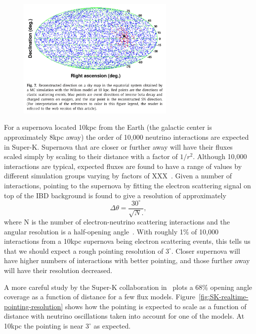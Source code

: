 \documentclass[11pt]{article}
\newcommand{\superk}  {Super\nobreakdash-K\xspace}
\begin{document}
\begin{figure}
  \begin{center}
    \includegraphics[width=3.0in]{SK-realtime-monitor-pointing}
    \caption{}
    \label{fig:SK-realtime-monitor-pointing}
  \end{center}
\end{figure}

For a supernova located 10kpc from the Earth (the galactic center is
approximately 8kpc away) the order of 10,000 neutrino interactions are
expected in \superk.  Supernova that are closer or further away will
have their fluxes scaled simply by scaling to their distance with a
factor of $1/r^2$.  Although 10,000 interactions are typical, expected
fluxes are found to have a range of values by different simulation
groups varying by factors of XXX~\cite{model_references}.  Given a
number of interactions, pointing to the supernova by fitting the
electron scattering signal on top of the IBD background is found to
give a resolution of approximately
%
$$ \Delta \theta = \frac{30^\circ}{\sqrt{N}.}, $$
%
where N is the number of electron-neutrino scattering interactions and
the angular resolution is a half-opening
angle~\cite{2012ARNPS..62...81S}.  With roughly 1\% of 10,000
interactions from a 10kpc supernova being electron scattering events,
this tells us that we should expect a rough pointing resolution of
$3^\circ$.  Closer supernova will have higher numbers of interactions
with better pointing, and those further away will have their
resolution decreased.

A more careful study by the \superk collaboration
in~\cite{2016APh....81...39A} plots a 68\% opening angle coverage as a
function of distance for a few flux
models. Figure~\ref{fig:SK-realtime-pointing-resolution} shows how the
pointing is expected to scale as a function of distance with neutrino
oscillations taken into account for one of the models. At 10kpc the
pointing is near $3^\circ$ as expected.
\end{document}
